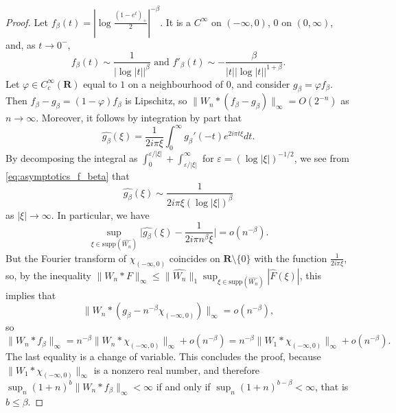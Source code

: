\documentclass[10pt]{amsart}
\newcommand{\R}{\mathbf{R}}
\begin{document}
\begin{proof}
Let $f_\beta (t)= |\log \frac{(1-e^t)_+}{2}|^{-\beta}$. It is a $C^\infty$ on $(-\infty,0)$, $0$ on $(0,\infty)$, and, as $t\to 0^-$,
\begin{equation}\label{eq:asymptotics_f_beta}
    f_\beta(t) \sim \frac{1}{|\log |t| |^{\beta}} \textrm{ and } f'_\beta(t) \sim -\frac{\beta}{|t|  |\log |t| |^{1+\beta}}.
\end{equation}
Let $\varphi \in C^\infty_c(\R)$ equal to $1$ on a neighbourhood of $0$, and consider $g_\beta = \varphi f_\beta$. Then $f_\beta - g_\beta=(1-\varphi) f_\beta$ is Lipschitz, so $\|W_n \ast (f_\beta-g_\beta)\|_\infty = O(2^{-n})$ as $n\to \infty$. Moreover, it follows by integration by part that
\[ \widehat{g_\beta}(\xi) = \frac{1}{2i\pi\xi}\int_0^{\infty} g_\beta'(-t) e^{2i\pi t\xi} dt.\]
By decomposing the integral as $\int_0^{\varepsilon/|\xi|} + \int_{\varepsilon/|\xi|}^\infty$ for $\varepsilon = (\log |\xi|)^{-1/2}$, we see from \eqref{eq:asymptotics_f_beta} that \[\widehat{g_\beta}(\xi) \sim \frac{1}{2i\pi \xi (\log |\xi|)^\beta}\]
as $|\xi|\to \infty$. In particular, we have
\[ \sup_{\xi \in \mathrm{supp}(\widehat{W_n})} \big|\widehat{g_\beta}(\xi) - \frac{1}{2i\pi n^\beta \xi}\big| = o(n^{-\beta}).\]
But the Fourier transform of $\chi_{(-\infty,0)}$ coincides on $\R\setminus\{0\}$ with the function $\frac{1}{2i\pi \xi}$, so, by the inequality $\|W_n \ast F\|_\infty \leq \|\widehat{W_n}\|_1 \sup_{\xi \in \mathrm{supp}(\widehat{W_n})} |\widehat{F}(\xi)|$, this implies that
\[ \|W_n \ast (g_\beta - n^{-\beta}\chi_{(-\infty,0)})\|_\infty = o(n^{-\beta}),\]
so
\[ \|W_n \ast f_\beta\|_\infty = n^{-\beta} \|W_n \ast \chi_{(-\infty,0)}\|_\infty + o(n^{-\beta}) = n^{-\beta} \|W_1 \ast \chi_{(-\infty,0)}\|_\infty + o(n^{-\beta}) .\]
The last equality is a change of variable. This concludes the proof, because $\|W_1 \ast \chi_{(-\infty,0)}\|_\infty$  is a nonzero real number, and therefore $\sup_{n} (1+n)^{b} \|W_n\ast f_\beta\|_\infty <\infty$ if and only if $\sup_{n} (1+n)^{b-\beta}<\infty$, that is $b \leq \beta$.
\end{proof}
\end{document}
